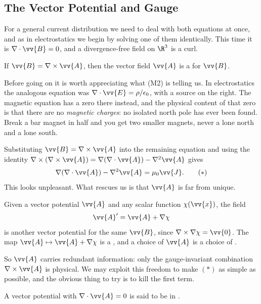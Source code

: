\subsection{The Vector Potential and Gauge}

For a general current distribution we need to deal with both equations at once, and as in electrostatics we begin by solving one of them identically. This time it is $\nabla\cdot\vv{B} = 0$, and a divergence-free field on $\R^3$ is a curl.

\begin{definition}
	If $\vv{B} = \nabla \times \vv{A}$, then the vector field $\vv{A}$ is a  for $\vv{B}$.
\end{definition}

Before going on it is worth appreciating what (M2) is telling us. In electrostatics the analogous equation was $\nabla\cdot\vv{E} = \rho/\epsilon_0$, with a source on the right. The magnetic equation has a zero there instead, and the physical content of that zero is that there are no \emph{magnetic charges}: no isolated north pole has ever been found. Break a bar magnet in half and you get two smaller magnets, never a lone north and a lone south.

Substituting $\vv{B} = \nabla\times\vv{A}$ into the remaining equation and using the identity $\nabla\times(\nabla\times \vv{A}) = \nabla(\nabla\cdot \vv{A}) - \nabla^2 \vv{A}$ gives
\begin{align*}
\nabla(\nabla\cdot \vv{A}) - \nabla^2 \vv{A} = \mu_0 \vv{J}. \tag{$*$}
\end{align*}
This looks unpleasant. What rescues us is that $\vv{A}$ is far from unique.

\begin{definition}
	Given a vector potential $\vv{A}$ and any scalar function $\chi(\vv{x})$, the field
	$$
	\vv{A}' = \vv{A} + \nabla \chi
	$$
	is another vector potential for the same $\vv{B}$, since $\nabla\times \nabla\chi = \vv{0}$. The map $\vv{A}\mapsto \vv{A}+\nabla\chi$ is a , and a choice of $\vv{A}$ is a choice of .
\end{definition}

So $\vv{A}$ carries redundant information: only the gauge-invariant combination $\nabla\times \vv{A}$ is physical. We may exploit this freedom to make $(*)$ as simple as possible, and the obvious thing to try is to kill the first term.

\begin{definition}
	A vector potential with $\nabla\cdot \vv{A} = 0$ is said to be in .
\end{definition}

